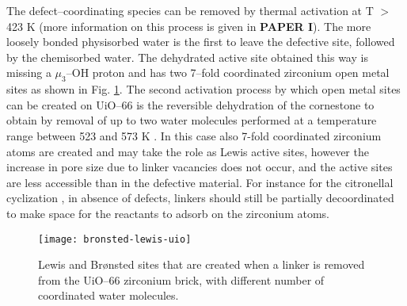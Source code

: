 The defect--coordinating species can be removed by thermal activation at T $>$423 K (more information on this process is given in \textbf{PAPER I}). The more loosely bonded physisorbed water is the first to leave the defective site, followed by the chemisorbed water. The dehydrated active site obtained this way is missing a $\mu_{3}$--OH proton and has two 7--fold coordinated zirconium open metal sites as shown in Fig. \ref{fig:bronsted-lewis-uio}. 
\npar
The second activation process by which open metal sites can be created on UiO--66 is the reversible dehydration of the  cornestone to obtain  by removal of up to two water molecules performed at a temperature range between 523 and 573 K \cite{valenzano2011disclosing}. In this case also 7-fold coordinated zirconium atoms are created and may take the role as Lewis active sites, however the increase in pore size due to linker vacancies does not occur, and the active sites are less accessible than in the defective material. For instance for the citronellal cyclization \cite{vermoortele2012electronic}, in absence of defects, linkers should still be partially decoordinated to make space for the reactants to adsorb on the zirconium atoms.

\begin{figure}[!htbp]
	\centering
 	\texttt{[image: bronsted-lewis-uio]}
	\caption{Lewis and Br\o{}nsted sites that are created when a linker is removed from the UiO--66 zirconium brick, with different number of coordinated water molecules.}
	\label{fig:bronsted-lewis-uio}
\end{figure}

